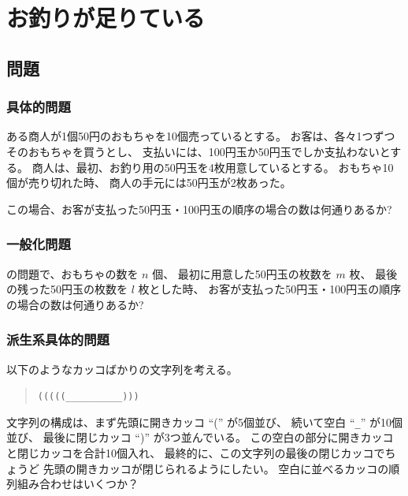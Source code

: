 \section{お釣りが足りている}
\label{s:お釣り}

\subsection{問題}
\label{ssec:お釣り:問題}

\subsubsection{具体的問題}
\label{sssec:お釣り:問題:具体的問題}

ある商人が1個50円のおもちゃを10個売っているとする。
お客は、各々1つずつそのおもちゃを買うとし、
支払いには、100円玉か50円玉でしか支払わないとする。
商人は、最初、お釣り用の50円玉を4枚用意しているとする。
おもちゃ10個が売り切れた時、
商人の手元には50円玉が2枚あった。

この場合、お客が支払った50円玉・100円玉の順序の場合の数は何通りあるか?

\subsubsection{一般化問題}
\label{sssec:お釣り:問題:一般化問題}

の問題で、おもちゃの数を $n$ 個、
最初に用意した50円玉の枚数を $m$ 枚、
最後の残った50円玉の枚数を $l$ 枚とした時、
お客が支払った50円玉・100円玉の順序の場合の数は何通りあるか?


\subsubsection{派生系具体的問題}
\label{sssec:お釣り:問題:派生系具体的問題}

以下のようなカッコばかりの文字列を考える。
\begin{quote}
  \verb|(((((__________)))|
\end{quote}
文字列の構成は、まず先頭に開きカッコ ``('' が5個並び、
続いて空白 ``\verb|_|'' が10個並び、
最後に閉じカッコ ``)'' が3つ並んでいる。
この空白の部分に開きカッコと閉じカッコを合計10個入れ、
最終的に、この文字列の最後の閉じカッコでちょうど
先頭の開きカッコが閉じられるようにしたい。
空白に並べるカッコの順列組み合わせはいくつか？

